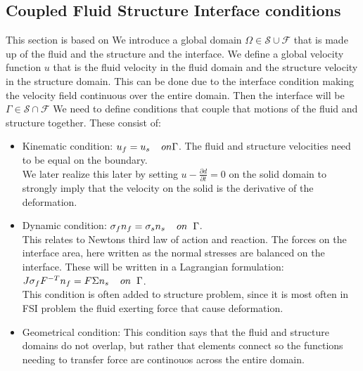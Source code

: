 \subsection*{Coupled Fluid Structure Interface conditions}
This section is based on 
We introduce a global domain $\Omega \in \mathcal{S} \cup \mathcal{F} $ that is made up of the fluid and the structure and the interface. We define a global velocity function $u$ that is the fluid velocity in the fluid domain and the structure velocity in the structure domain. This can be done due to the interface condition making the velocity field continuous over the entire domain. Then the interface will be $ \Gamma \in \mathcal{S} \cap \mathcal{F}  $  
We need to define conditions that couple that motions of the fluid and structure together. These consist of:
\begin{itemize}
\item Kinematic condition: $u_f = u_s  \hspace{4mm} on \Gamma$. The fluid and structure velocities need to be equal on the boundary. \\
We later realize this later by setting  $u- \frac{\partial d}{\partial t}  = 0  $ on the solid domain to strongly imply that the velocity on the solid is the derivative of the deformation.  
\item Dynamic condition: $  \sigma_f n_f = \sigma_s n_s \hspace{4mm} on  \hspace{2mm}\Gamma   $. \\
	This relates to Newtons third law of action and reaction. The forces on the interface area, here written as the normal stresses are balanced on the interface. These will be written in a Lagrangian formulation: \\
	$J\sigma_f F^{-T} n_f = F\Sigma n_s \hspace{4mm} on  \hspace{2mm}\Gamma $. \\
	This condition is often added to structure problem, since it is most often in FSI problem the fluid exerting force that cause deformation.
\item Geometrical condition: This condition says that the fluid and structure domains do not overlap, but rather that elements connect so the functions needing to transfer force are continouos across the entire domain.
\end{itemize}

